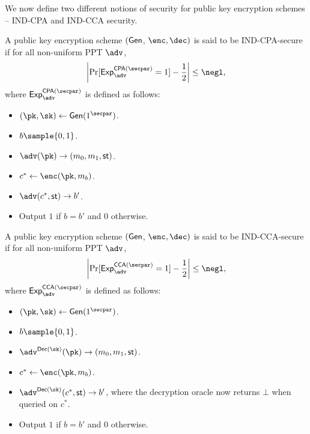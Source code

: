 We now define two different notions of security for public key encryption schemes -- IND-CPA and IND-CCA security.
\begin{definition}
    A public key encryption scheme $(\mathsf{Gen}$, $\enc, \dec)$ is said to be IND-CPA-secure if for all non-uniform PPT $\adv$,
    \[\left|\Pr[\mathsf{Exp}_{\adv}^{\mathsf{CPA}(\secpar)} = 1] - \frac{1}{2}\right| \leq \negl,\]
    where $\mathsf{Exp}_{\adv}^{\mathsf{CPA}(\secpar)}$ is defined as follows:
    \begin{itemize}
        \item $(\pk, \sk) \gets \gen(1^\secpar)$.
        \item $b \sample \{0,1\}$.
        \item $\adv(\pk) \to (m_0, m_1, \mathsf{st})$.
        \item $c^* \gets \enc(\pk, m_b)$.
        \item $\adv(c^*, \mathsf{st}) \to b'$.
        \item Output $1$ if $b = b'$ and $0$ otherwise.
    \end{itemize}
\end{definition}

\begin{definition}
    A public key encryption scheme $(\mathsf{Gen}$, $\enc, \dec)$ is said to be IND-CCA-secure if for all non-uniform PPT $\adv$,
    \[\left|\Pr[\mathsf{Exp}_{\adv}^{\mathsf{CCA}(\secpar)} = 1] - \frac{1}{2}\right| \leq \negl,\]
    where $\mathsf{Exp}_{\adv}^{\mathsf{CCA}(\secpar)}$ is defined as follows:
    \begin{itemize}
        \item $(\pk, \sk) \gets \gen(1^\secpar)$.
        \item $b \sample \{0,1\}$.
        \item $\adv^{\Dec(\sk)}(\pk) \to (m_0, m_1, \mathsf{st})$.
        \item $c^* \gets \enc(\pk, m_b)$.
        \item $\adv^{\Dec(\sk)}(c^*, \mathsf{st}) \to b'$, where the decryption oracle now returns $\bot$ when queried on $c^*$.
        \item Output $1$ if $b = b'$ and $0$ otherwise.
    \end{itemize}
\end{definition}

